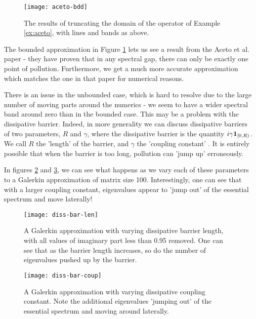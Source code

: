 \documentclass[../main.tex]{subfiles}
\begin{document}
\begin{figure}[h!]
\centering
\texttt{[image: aceto-bdd]}
\caption{The results of truncating the domain of
  the operator of Example \ref{ex:aceto}, with lines and bands
  as above.}
\label{fig:aceto-bdd}
\end{figure}

The bounded approximation in Figure \ref{fig:aceto-bdd} lets us see a result from
the Aceto et al. paper - they have proven that in any spectral gap, there can only
be exactly one point of pollution. Furthermore, we get a much more accurate approximation
which matches the one in that paper for numerical reasons.

There is an issue in the unbounded case, which is hard to resolve due to the large number of
moving parts around the numerics - we seem to have a wider spectral band around zero than
in the bounded case.
This may be a problem with the dissipative barrier. Indeed, in more generality we can discuss
dissipative barriers of two parameters, $R$ and $\gamma$, where the dissipative barrier is the
quantity $i \gamma \mathbf{1}_{[0, R)}$. We call $R$ the 'length' of the barrier, and $\gamma$ the
'coupling constant' \cite{stepanenko2022spectral}. It is entirely possible that when the barrier
is too long, pollution can 'jump up' erroneously.

In figures \ref{fig:dbm-len} and \ref{fig:dbm-coup}, we can see what happens as we vary each of
these parameters to a Galerkin approximation of matrix size 100.
Interestingly, one can see that with a larger coupling constant, eigenvalues
appear to 'jump out' of the essential spectrum and move laterally!

\begin{figure}[p!]
  \centering
  \texttt{[image: diss-bar-len]}
  \caption{A Galerkin approximation with varying dissipative barrier length,
  with all values of imaginary part less than 0.95 removed. One can see that
  as the barrier length increases, so do the number of eigenvalues pushed up
  by the barrier.}
  \label{fig:dbm-len}
\end{figure}

\begin{figure}[p!]
  \centering
  \texttt{[image: diss-bar-coup]}
  \caption{A Galerkin approximation with varying dissipative coupling constant.
  Note the additional eigenvalues 'jumping out' of the essential spectrum and
  moving around laterally.}
  \label{fig:dbm-coup}
\end{figure}
\clearpage
\end{document}
